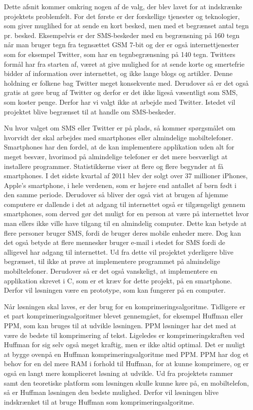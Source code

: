 Dette afsnit kommer omkring nogen af de valg, der blev lavet for at indskrænke projektets problemfelt. For det første er der forskellige tjenester og teknologier, som giver muglihed for at sende en kort besked, men med et begrænset antal tegn pr. besked. Eksempelvis er der SMS-beskeder med en begrænsning på 160 tegn når man bruger tegn fra tegnsættet GSM 7-bit\cite{Pro_1} og der er også internettjenester som for eksempel Twitter, som har en tegnbegrænsning på 140 tegn\cite{pro_af1}. Twitters formål har fra starten af, været at give mulighed for at sende korte og smertefrie bidder af information over internettet, og ikke lange blogs og artikler. Denne holdning er folkene bag Twitter meget konsekvente med\cite{pro_af2}. Derudover så er det også gratis at gøre brug af Twitter og derfor er det ikke ligeså væsentligt som SMS, som koster penge. Derfor har vi valgt ikke at arbejde med Twitter. Istedet vil projektet blive begrænset til at handle om SMS-beskeder.

Nu hvor valget om SMS eller Twitter er på plads, så kommer spørgsmålet om hvorvidt der skal arbejdes med smartphones eller almindelige mobiltelefoner. Smartphones har den fordel, at de kan implementere applikation uden alt for meget besvær, hvorimod på almindelige telefoner er det mere besværligt at installere programmer. Statistikkerne viser at flere og flere begynder at få smartphones\cite{pro_af3}. I det sidste kvartal af 2011 blev der solgt over 37 millioner iPhones, Apple's smartphone, i hele verdenen, som er højere end antallet af børn født i den samme periode\cite{pro_af4}. Derudover så bliver der også vist at brugen af hjemme computere er dallende i det at adgang til internettet også er tilgængeligt gennem smartphones, som derved gør det muligt for en person at være på internettet hvor man ellers ikke ville have tilgang til en almindelig computer\cite{pro_af3}. Dette kan betyde at flere personer bruger SMS, fordi de bruger deres mobile enheder mere. Dog kan det også betyde at flere mennesker bruger e-mail i stedet for SMS fordi de alligevel har adgang til internettet. Ud fra dette vil projektet yderligere blive begrænset, til ikke at prøve at implementere programmet på almindelige mobiltelefoner. Derudover så er det også vanskeligt, at implementere en applikation skrevet i C, som er et kræv for dette projekt, på en smartphone. Derfor vil løsningen være en prototype, som kan fungerer på en computer. 

Når løsningen skal laves, er der brug for en komprimeringsalgoritme. Tidligere er et part komprimeringsalgoritmer blevet gennemgået, for eksempel Huffman eller PPM, som kan bruges til at udvikle løsningen. PPM løsninger har det med at være de bedste til komprimering af tekst. Ligeledes er komprimeringskraften ved Huffman for sig selv også meget kraftig, men er ikke altid optimal. Det er muligt at bygge ovenpå en Huffman komprimeringsalgoritme med PPM. PPM har dog et behov for en del mere RAM i forhold til Huffman, for at kunne komprimere, og er også en langt mere kompliceret løsning at udvikle. Ud fra projektets rammer samt den teoretiske platform som løsningen skulle kunne køre på, en mobiltelefon, så er Huffman løsningen den bedste mulighed. Derfor vil løsningen blive indskrænket til at bruge Huffman som komprimeringsalgoritme.\cite{pro_af5}

